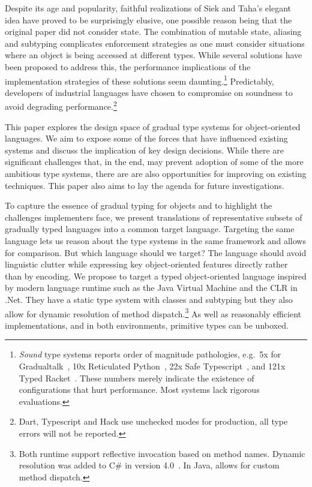 \documentclass[acmlarge, anonymous, authordraft]{acmart}
\begin{document}
Despite its age and popularity, faithful realizations of Siek and Taha's
elegant idea have proved to be surprisingly elusive, one possible reason
being that the original paper did not consider state. The combination of
mutable state, aliasing and subtyping complicates enforcement strategies as
one must consider situations where an object is being accessed at different
types. While several solutions have been proposed to address this, the
performance implications of the implementation strategies of these solutions
seem daunting.\footnote{\emph{Sound} type systems reports order of magnitude
  pathologies, e.g.~5x for Gradualtalk~\cite{allende13}, 10x Reticulated
  Python~\cite{siek14}, 22x Safe Typescript~\cite{safe-typescript}, and 121x
  Typed Racket~\cite{popl16}. These numbers merely indicate the existence of
  configurations that hurt performance.  Most systems lack rigorous
  evaluations. } Predictably, developers of industrial languages have chosen
to compromise on soundness to avoid degrading performance.\footnote{Dart,
  Typescript and Hack use unchecked modes for production, all type errors
  will not be reported.}

This paper explores the design space of gradual type systems for object-oriented
languages. We aim to expose some of the forces that have influenced existing
systems and discuss the implication of key design decisions. While there are
significant challenges that, in the end, may prevent adoption of some of the
more ambitious type systems, there are are also opportunities for improving on
existing techniques.  This paper also aims to lay the agenda for future
investigations.

To capture the essence of gradual typing for objects and to highlight the
challenges implementers face, we present translations of representative subsets
of gradually typed languages into a common target language. Targeting the same
language lets us reason about the type systems in the same framework and allows
for comparison. But which language should we target? The language should avoid
linguistic clutter while expressing key object-oriented features directly rather
than by encoding. We propose to target a typed object-oriented language
inspired by modern language runtime such as the Java Virtual Machine and the
CLR in .Net. They have a static type system with classes and subtyping but they
also allow for dynamic resolution of method dispatch.\footnote{Both runtime
support reflective invocation based on method names. Dynamic resolution was
added to C\# in version 4.0~\cite{BAT14}. In Java,  allows for
custom method dispatch.} As well as reasonably efficient implementations, and in
both environments, primitive types can be unboxed.
\end{document}
